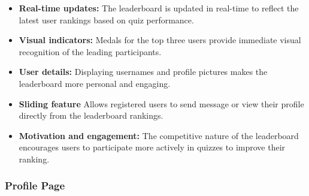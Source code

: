 \begin{itemize}
\item \textbf{Real-time updates:} The leaderboard is updated in real-time to reflect the latest user rankings based on quiz performance.
\item \textbf{Visual indicators:} Medals for the top three users provide immediate visual recognition of the leading participants.
\item \textbf{User details:} Displaying usernames and profile pictures makes the leaderboard more personal and engaging.
\item \textbf{Sliding feature} Allows registered users to send message or view their profile directly from the leaderboard rankings.
\item \textbf{Motivation and engagement:} The competitive nature of the leaderboard encourages users to participate more actively in quizzes to improve their ranking.
\end{itemize}

\subsubsection{Profile Page}

